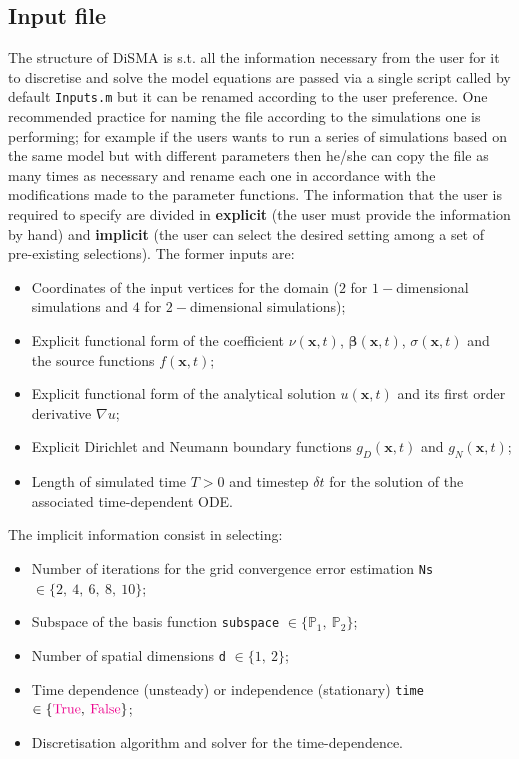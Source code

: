 \documentclass[12pt,openany,twoside,a4paper]{article}
\newcommand{\code}[1]{\colorbox{light-gray}{\texttt{#1}}}
\begin{document}
\subsection{Input file}
The structure of DiSMA is s.t. all the information necessary from the user for it to discretise and solve the model equations are passed via a single script called by default \code{Inputs.m} but it can be renamed according to the user preference. One recommended practice for naming the file according to the simulations one is performing; for example if the users wants to run a series of simulations based on the same model but with different parameters then he/she can copy the file as many times as necessary and rename each one in accordance with the modifications made to the parameter functions.
\newline
The information that the user is required to specify are divided in \textbf{explicit} (the user must provide the information by hand) and \textbf{implicit} (the user can select the desired setting among a set of pre-existing selections). The former inputs are:
\begin{itemize}
    \item Coordinates of the input vertices for the domain ($2$ for $1-$dimensional simulations and $4$ for $2-$dimensional simulations);
    \item Explicit functional form of the coefficient $\nu(\mathbf{x},t)$, $\boldsymbol{\beta}(\mathbf{x},t)$, $\sigma(\mathbf{x},t)$ and the source functions $f(\mathbf{x},t)$;
    \item Explicit functional form of the analytical solution $u(\mathbf{x},t)$ and its first order derivative $\nabla u$;
    \item Explicit Dirichlet and Neumann boundary functions $g_D(\mathbf{x},t)$ and $g_N(\mathbf{x},t)$;
    \item Length of simulated time $T>0$ and timestep $\delta t$ for the solution of the associated time-dependent ODE. 
\end{itemize}
The implicit information consist in selecting:
\begin{itemize}
    \item Number of iterations for the grid convergence error estimation \code{Ns} $\in \{2,\:4,\:6,\:8,\:10\}$;
    \item Subspace of the basis function \code{subspace} $\in\{{\mathbb{P}_1,\:\mathbb{P}_2}\}$;
    \item Number of spatial dimensions \code{d} $\in\{{1,\:2}\}$;
    \item Time dependence (unsteady) or independence (stationary) \code{time} $\in\{\text{\textcolor{magenta}{True}},\:\text{\textcolor{magenta}{False}}\}$;
    \item Discretisation algorithm and solver for the time-dependence.
\end{itemize}
\end{document}

